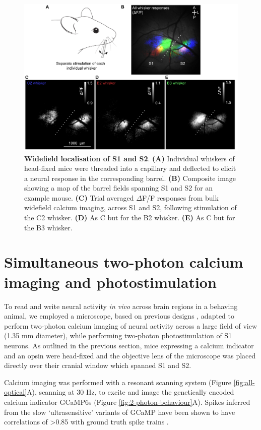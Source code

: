 \begin{figure}[h]
\includegraphics[scale=0.62]{figures/widefield-localisation.pdf}
\caption[\textbf{Widefield localisation of S1 and S2}]{
\textbf{Widefield localisation of S1 and S2}. \textbf{(A)} Individual whiskers of head-fixed mice were threaded into a capillary and deflected to elicit a neural response in the corresponding barrel. \textbf{(B)} Composite image showing a map of the barrel fields spanning S1 and S2 for an example mouse. \textbf{(C)} Trial averaged $\Delta$F/F responses from bulk widefield calcium imaging, across S1 and S2, following stimulation of the C2 whisker. \textbf{(D)} As C but for the B2 whisker. \textbf{(E)} As C but for the B3 whisker.
} 
\label{fig:widefield}
\end{figure}

\section{Simultaneous two-photon calcium imaging and photostimulation}

To read and write neural activity \textit{in vivo} across brain regions in a behaving animal, we employed a microscope, based on previous designs \cite{packer_simultaneous_2015}, adapted to perform two-photon calcium imaging of neural activity across a large field of view (1.35 mm diameter), while performing two-photon photostimulation of S1 neurons. As outlined in the previous section, mice expressing a calcium indicator and an opsin were head-fixed and the objective lens of the microscope was placed directly over their cranial window which spanned S1 and S2. 

Calcium imaging was performed with a resonant scanning system (Figure \ref{fig:all-optical}A), scanning at 30 Hz, to excite and image the genetically encoded calcium indicator GCaMP6s \cite{chen_behaviour-dependent_2013} (Figure \ref{fig:2-photon-behaviour}A). Spikes inferred from the slow ‘ultrasensitive’ variants of GCaMP have been shown to have correlations of >0.85 with ground truth spike trains \cite{friedrich_fast_2017}.

